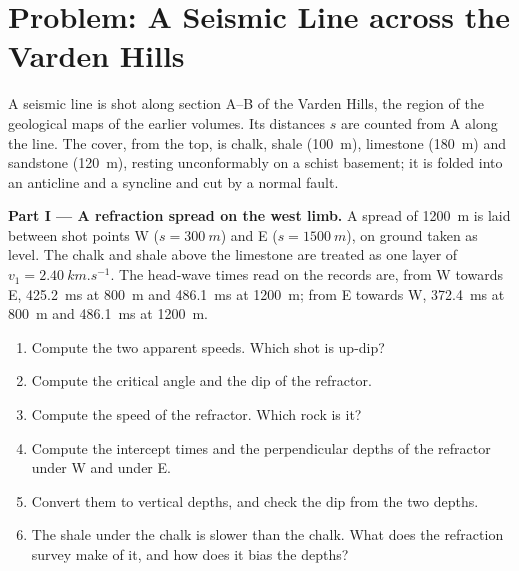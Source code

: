 \section{Problem: A Seismic Line across the Varden Hills}

\begin{problem}
\label{pb:b3:exploration-seismology:1}
A seismic line is shot along section A--B of the Varden Hills, the region of
the geological maps of the earlier volumes. Its distances $s$ are counted from
A along the line. The cover, from the top, is chalk, shale (\qty{100}{m}),
limestone (\qty{180}{m}) and sandstone (\qty{120}{m}), resting unconformably on
a schist basement; it is folded into an anticline and a syncline and cut by a
normal fault.

\medskip
\noindent\textbf{Part I --- A refraction spread on the west limb.} A spread of
\qty{1200}{m} is laid between shot points W ($s = \qty{300}{m}$) and E
($s = \qty{1500}{m}$), on ground taken as level. The chalk and shale above the
limestone are treated as one layer of $v_1 = \qty{2.40}{km.s^{-1}}$. The
head-wave times read on the records are, from W towards E, \qty{425.2}{ms} at
\qty{800}{m} and \qty{486.1}{ms} at \qty{1200}{m}; from E towards W,
\qty{372.4}{ms} at \qty{800}{m} and \qty{486.1}{ms} at \qty{1200}{m}.
\begin{enumerate}
  \item Compute the two apparent speeds. Which shot is up-dip?
  \item Compute the critical angle and the dip of the refractor.
  \item Compute the speed of the refractor. Which rock is it?
  \item Compute the intercept times and the perpendicular depths of the
        refractor under W and under E.
  \item Convert them to vertical depths, and check the dip from the two depths.
  \item The shale under the chalk is slower than the chalk. What does the
        refraction survey make of it, and how does it bias the depths?
\end{enumerate}


\end{problem}
